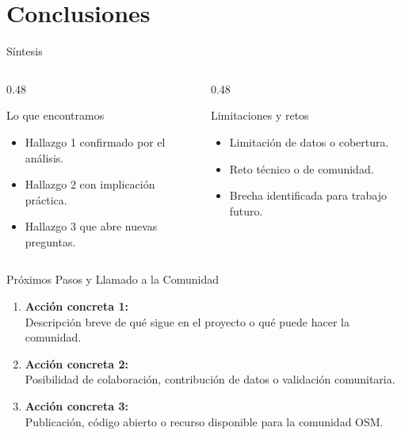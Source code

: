 
\section{Conclusiones}

\begin{frame}{Síntesis}
  \begin{columns}[T]
    \begin{column}{0.48\textwidth}
      \begin{block}{Lo que encontramos}
        \begin{itemize}
          \item Hallazgo 1 confirmado por el análisis.
          \item Hallazgo 2 con implicación práctica.
          \item Hallazgo 3 que abre nuevas preguntas.
        \end{itemize}
      \end{block}
    \end{column}
    \begin{column}{0.48\textwidth}
      \begin{alertblock}{Limitaciones y retos}
        \begin{itemize}
          \item Limitación de datos o cobertura.
          \item Reto técnico o de comunidad.
          \item Brecha identificada para trabajo futuro.
        \end{itemize}
      \end{alertblock}
    \end{column}
  \end{columns}
\end{frame}

\begin{frame}{Próximos Pasos y Llamado a la Comunidad}
  \begin{enumerate}
    \item \textbf{Acción concreta 1:} \\
          Descripción breve de qué sigue en el proyecto o qué puede hacer la comunidad.
    \item \textbf{Acción concreta 2:} \\
          Posibilidad de colaboración, contribución de datos o validación comunitaria.
    \item \textbf{Acción concreta 3:} \\
          Publicación, código abierto o recurso disponible para la comunidad OSM.
  \end{enumerate}
\end{frame}

